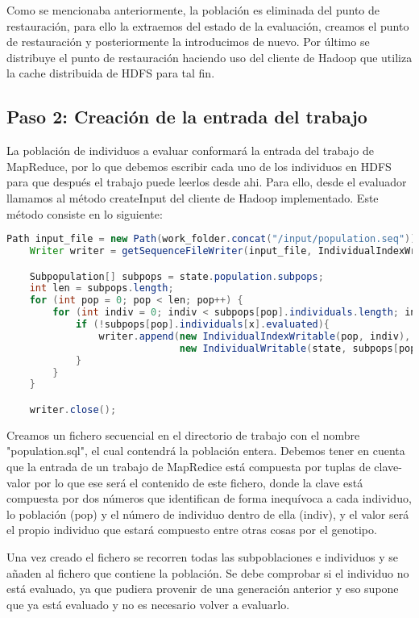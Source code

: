 Como se mencionaba anteriormente, la población es eliminada del punto de restauración, para ello la extraemos del estado de la evaluación, creamos el punto de restauración y posteriormente la introducimos de nuevo. Por \'ultimo se distribuye el punto de restauración haciendo uso del cliente de Hadoop que utiliza la cache distribuida de HDFS para tal fin.

\subsection{Paso 2: Creación de la entrada del trabajo}

La población de individuos a evaluar conformar\'a la entrada del trabajo de MapReduce, por lo que debemos escribir cada uno de los individuos en HDFS para que después el trabajo puede leerlos desde ahi. Para ello, desde el evaluador llamamos al método createInput del cliente de Hadoop implementado. Este método consiste en lo siguiente:

\begin{lstlisting}[language=Java]
	Path input_file = new Path(work_folder.concat("/input/population.seq"));
	Writer writer = getSequenceFileWriter(input_file, IndividualIndexWritable.class, IndividualWritable.class);

	Subpopulation[] subpops = state.population.subpops;
	int len = subpops.length;
	for (int pop = 0; pop < len; pop++) {
		for (int indiv = 0; indiv < subpops[pop].individuals.length; indiv++) {
			if (!subpops[pop].individuals[x].evaluated){
				writer.append(new IndividualIndexWritable(pop, indiv), 
						      new IndividualWritable(state, subpops[pop].individuals[indiv]));
			}
		}
	}

	writer.close();
\end{lstlisting}

Creamos un fichero secuencial en el directorio de trabajo con el nombre "population.sql", el cual contendrá la población entera. Debemos tener en cuenta que la entrada de un trabajo de MapRedice est\'a compuesta por tuplas de clave-valor por lo que ese ser\'a el contenido de este fichero, donde la clave est\'a compuesta por dos números que identifican de forma inequívoca a cada individuo, lo población (pop) y el n\'umero de individuo dentro de ella (indiv), y el valor ser\'a el propio individuo que estará compuesto entre otras cosas por el genotipo.

Una vez creado el fichero se recorren todas las subpoblaciones e individuos y se a\~naden al fichero que contiene la población. Se debe comprobar si el individuo no est\'a evaluado, ya que pudiera provenir de una generación anterior y eso supone que ya est\'a evaluado y no es necesario volver a evaluarlo.

